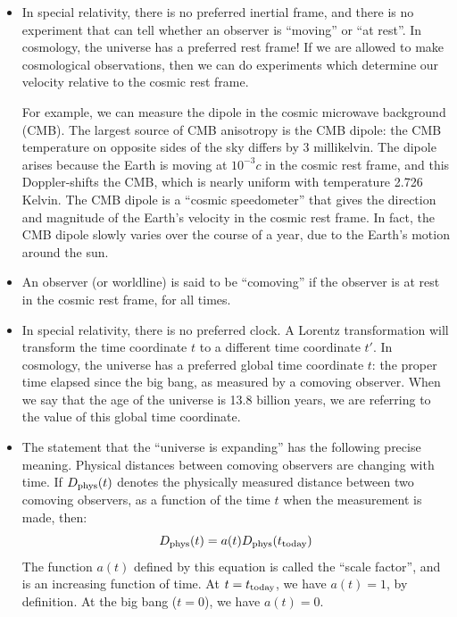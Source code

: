 \documentclass[aps,prd,superscriptaddress,groupedaddress,nofootinbib,nobibnotes]{revtex4}
\newcommand{\be}{\begin{equation}}
\newcommand{\ee}{\end{equation}}
\begin{document}
\begin{itemize}

\item
In special relativity, there is no preferred inertial frame, and there is no experiment that can tell whether an observer is ``moving'' or ``at rest''.
In cosmology, the universe has a preferred rest frame!
If we are allowed to make cosmological observations, then we can do experiments which determine our velocity relative to the cosmic rest frame.

For example, we can measure the dipole in the cosmic microwave background (CMB).
The largest source of CMB anisotropy is the CMB dipole: the CMB temperature on opposite sides of the sky differs by 3 millikelvin.
The dipole arises because the Earth is moving at $10^{-3}c$ in the cosmic rest frame, and this Doppler-shifts the CMB, which is nearly
uniform with temperature 2.726 Kelvin.
The CMB dipole is a ``cosmic speedometer'' that gives the direction and magnitude of the Earth's velocity in the cosmic rest frame.
In fact, the CMB dipole slowly varies over the course of a year, due to the Earth's motion around the sun.

\item
An observer (or worldline) is said to be ``comoving'' if the observer is at rest in the cosmic rest frame, for all times.

\item
In special relativity, there is no preferred clock.
A Lorentz transformation will transform the time coordinate $t$ to a different time coordinate $t'$.
In cosmology, the universe has a preferred global time coordinate $t$: the proper time elapsed since the
big bang, as measured by a comoving observer.
When we say that the age of the universe is 13.8 billion years, we are referring to the value of this global time coordinate.

\item
The statement that the ``universe is expanding'' has the following precise meaning.
Physical distances between comoving observers are changing with time. 
If $D_{\rm phys}(t)$ denotes the physically measured distance between two comoving observers, as a function of the 
time $t$ when the measurement is made, then:
\be
D_{\rm phys}(t) = a(t) D_{\rm phys}(t_{\rm today})
\ee
The function $a(t)$ defined by this equation is called the ``scale factor'', and is an increasing function of time.
At $t=t_{\rm today}$, we have $a(t)=1$, by definition.
At the big bang ($t=0$), we have $a(t)=0$.


\end{itemize}
\end{document}
